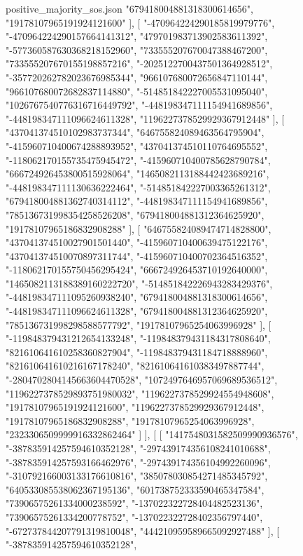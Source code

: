\begin{filecontents*}[overwrite]{positive_majority_sos.json}
    "679418004881318300614656",
    "19178107965191924121600"
   ],
   [
    "-470964224290185819979776",
    "-470964224290157664141312",
    "479701983713902583611392",
    "-577360587630368218152960",
    "733555207670047388467200",
    "733555207670155198857216",
    "-2025122700437501364928512",
    "-357720262782023676985344",
    "966107680072656847110144",
    "966107680072682837114880",
    "-514851842227005531095040",
    "1026767540776316716449792",
    "-448198347111154941689856",
    "-448198347111096624611328",
    "1196227378529929367912448"
   ],
   [
    "437041374510102983737344",
    "646755824089463564795904",
    "-415960710400674288893952",
    "437041374510110764695552",
    "-118062170155735475945472",
    "-415960710400785628790784",
    "666724926453800515928064",
    "1465082113188442423689216",
    "-448198347111130636222464",
    "-514851842227003365261312",
    "679418004881362740314112",
    "-448198347111154941689856",
    "785136731998354258526208",
    "679418004881312364625920",
    "19178107965186832908288"
   ],
   [
    "646755824089474714828800",
    "437041374510027901501440",
    "-415960710400639475122176",
    "437041374510070897311744",
    "-415960710400702364516352",
    "-118062170155750456295424",
    "666724926453710192640000",
    "1465082113188389160222720",
    "-514851842226943283429376",
    "-448198347111095260938240",
    "679418004881318300614656",
    "-448198347111096624611328",
    "679418004881312364625920",
    "785136731998298588577792",
    "19178107965254063996928"
   ],
   [
    "-119848379431212654133248",
    "-119848379431184317808640",
    "821610641610258360827904",
    "-119848379431184718888960",
    "821610641610216167178240",
    "821610641610383497887744",
    "-2804702804145663604470528",
    "1072497646957069689536512",
    "1196227378529893751980032",
    "1196227378529924554948608",
    "19178107965191924121600",
    "1196227378529929367912448",
    "19178107965186832908288",
    "19178107965254063996928",
    "2323306509999916332862464"
   ]
  ],
  [
   [
    "1417548031582509990936576",
    "-387835914257594610352128",
    "-297439174356108241010688",
    "-387835914257593166462976",
    "-297439174356104992260096",
    "-310792166003133176610816",
    "385078030854271485345792",
    "640533085538062367195136",
    "601738752333590465347584",
    "73906575261334000238592",
    "-137022322728404482523136",
    "73906575261334200778752",
    "-137022322728402356797440",
    "-672737844207791319810048",
    "444210959589665092927488"
   ],
   [
    "-387835914257594610352128",

\end{filecontents*}
